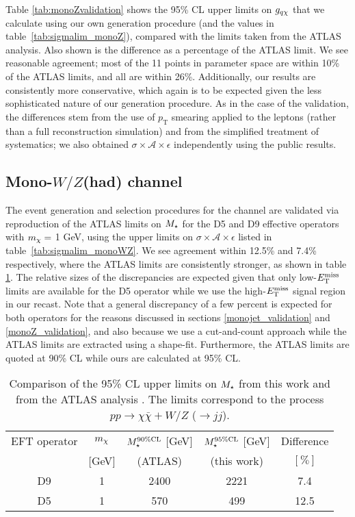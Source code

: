 Table \ref{tab:monoZvalidation} shows the 95\% CL upper limits on $g_{q \chi}$ that we calculate using our own generation procedure (and the values in table~\ref{tab:sigmalim_monoZ}), compared with the limits taken from the ATLAS analysis. Also shown is the difference as a percentage of the ATLAS limit. We see reasonable agreement; most of the 11 points in parameter space are within 10\% of the ATLAS limits, and all are within 26\%. Additionally, our results are consistently more conservative, which again is to be expected given the less sophisticated nature of our generation procedure. As in the case of the \monojet validation, the differences stem from the use of $p_{\mathrm{T}}$ smearing applied to the leptons (rather than a full reconstruction simulation) and from the simplified treatment of systematics; we also obtained $\sigma \times \mathcal{A} \times \epsilon$ independently using the public results.

\subsection{Mono-$W/Z$(had) channel}
\label{monoWZ_validation}

The event generation and selection procedures for the \monoWZ channel are validated via reproduction of the ATLAS limits on $M_{\star}$ for the D5 and D9 effective operators with $m_{\chi} = $ 1 GeV, using the upper limits on $\sigma \times \mathcal{A} \times \epsilon$ listed in table~\ref{tab:sigmalim_monoWZ}. We see agreement within 12.5\% and 7.4\% respectively, where the ATLAS limits are consistently stronger, as shown in table \ref{tab:monoWZvalidation}. The relative sizes of the discrepancies are expected given that only low-$E_{\mathrm{T}}^{\mathrm{miss}}$ limits are available for the D5 operator while we use the high-$E_{\mathrm{T}}^{\mathrm{miss}}$ signal region in our recast. Note that a general discrepancy of a few percent is expected for both operators for the reasons discussed in sections \ref{monojet_validation} and \ref{monoZ_validation}, and also because we use a cut-and-count approach while the ATLAS limits are extracted using a shape-fit. Furthermore, the ATLAS limits are quoted at 90\% CL while ours are calculated at 95\% CL.

\begin{table}[!h]
\begin{center}
\begin{tabular}{ c | c | c | c | c }
\hline
\hline
EFT operator & $m_{\chi}$ & $M_{\star}^{90\%\mathrm{CL}}$ $[$GeV$]$ & $M_{\star}^{95\%\mathrm{CL}}$ $[$GeV$]$  & Difference \T \\
&$[$GeV$]$ & (ATLAS) & (this work) & $[\%]$ \B \\
\hline
D9 & 1 & 2400 & 2221 & 7.4 \\
D5 & 1 & 570 & 499 & 12.5 \\
\hline
\hline
\end{tabular}
\end{center}
\caption{Comparison of the 95\% CL upper limits on $M_{\star}$ from this work and from the ATLAS \monoWZ analysis \cite{Aad:2013monoWZ}. The limits correspond to the process $pp \rightarrow \chi \bar{\chi} + W/Z$ ($\rightarrow jj$).}
\label{tab:monoWZvalidation}
\end{table}

